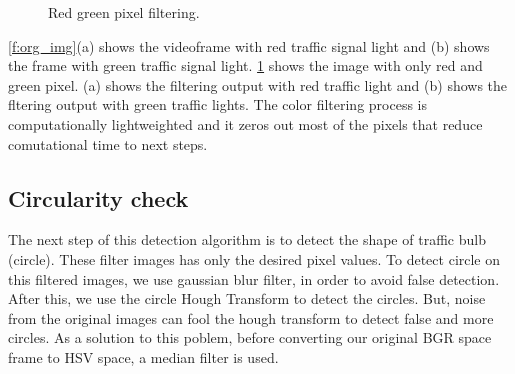 \begin{figure}[!ht]
\centering
{}

\caption{Red green pixel filtering.}
\label{f:fil_img}
\end{figure}

\ref{f:org_img}(a) shows the videoframe with red traffic signal light and (b) shows the frame with green traffic signal light.
\ref{f:fil_img} shows the image with only red and green pixel.
(a) shows the filtering output with red traffic light and (b) shows the fltering output with green traffic lights.
The color filtering process is computationally lightweighted and it zeros out most of the pixels that reduce comutational time to next steps.

\subsection{Circularity check}
The next step of this detection algorithm is to detect the shape of traffic bulb (circle).
These filter images has only the desired pixel values.
To detect circle on this filtered images, we use gaussian blur filter, in order to avoid false detection.
After this, we use the circle Hough Transform \cite{hough_circle} to detect the circles.
But, noise from the original images can fool the hough transform to detect false and more circles.
As a solution to this poblem, before converting our original BGR space frame to HSV space, a median filter is used.

